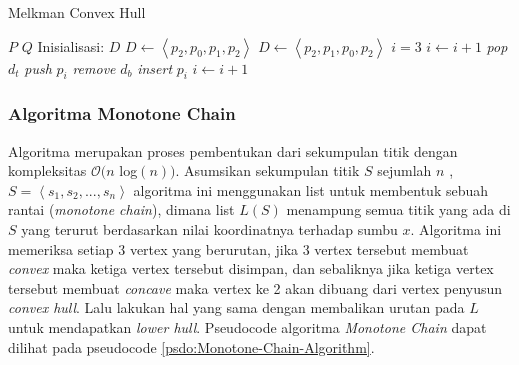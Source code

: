 \begin{algorithm}
	\caption{Melkman Convex Hull}
	\label{psdo:Melkman-Convex-Hull}
	\begin{algorithmic}[1]
		\Require $P$
		\Ensure $Q$
        \State Inisialisasi: $D$
            \State$D \leftarrow \left \langle p_2, p_0, p_1, p_2 \right \rangle$
        \Else
            \State $D \leftarrow \left \langle p_2, p_1, p_0, p_2 \right \rangle$
        \EndIf
        \State $i=3$
                \State $i \leftarrow i+1$
            \EndWhile
                \State \textit{pop} $d_t$
            \EndWhile
            \State \textit{push} $p_i$
                \State \textit{remove} $d_b$
            \EndWhile
            \State \textit{insert} $p_i$
            \State $i \leftarrow i+1$
        \EndWhile
	\end{algorithmic}
\end{algorithm}

\subsubsection{Algoritma Monotone Chain}
\label{sec:algoritma-monotone-chain}
Algoritma \MC merupakan proses pembentukan \CH dari sekumpulan titik dengan kompleksitas $\mathcal{O}(n$ log$(n))$\cite{monotone_chain_algorithm}. Asumsikan sekumpulan titik $S$ sejumlah $n$ ,$S = \left \langle s_1, s_2, ..., s_n\right \rangle$ algoritma ini menggunakan list untuk membentuk sebuah rantai (\textit{monotone chain}), dimana list $L(S)$ menampung semua titik yang ada di $S$ yang terurut berdasarkan nilai koordinatnya terhadap sumbu $x$. Algoritma ini memeriksa setiap 3 vertex yang berurutan, jika 3 vertex tersebut membuat \textit{convex} maka ketiga vertex tersebut disimpan, dan sebaliknya jika ketiga vertex tersebut membuat \textit{concave} maka vertex ke 2 akan dibuang dari vertex penyusun \textit{convex hull}. Lalu lakukan hal yang sama dengan membalikan urutan pada $L$ untuk mendapatkan \textit{lower hull}. Pseudocode algoritma \textit{Monotone Chain} dapat dilihat pada pseudocode \ref{psdo:Monotone-Chain-Algorithm}.

